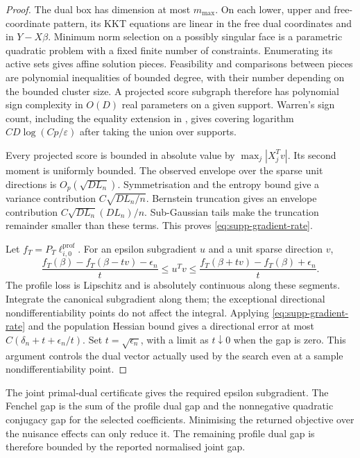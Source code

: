 \begin{proof}
The dual box has dimension at most $m_{\max}$. On each lower, upper
and free-coordinate pattern, its KKT equations are linear in the
free dual coordinates and in $Y-X\beta$. Minimum norm selection on a
possibly singular face is a parametric quadratic problem with a
fixed finite number of constraints. Enumerating its active sets gives
affine solution pieces. Feasibility and comparisons between pieces
are polynomial inequalities of bounded degree, with their number
depending on the bounded cluster size. A projected score subgraph
therefore has polynomial sign complexity in $O(D)$ real parameters
on a given support. Warren's sign count, including the equality
extension in , gives covering logarithm
$CD\log(Cp/\varepsilon)$ after taking the union over supports.

Every projected score is bounded in absolute value by
$\max_j|X_j^Tv|$. Its second moment is uniformly bounded. The observed
envelope over the sparse unit directions is $O_p(\sqrt{D L_n})$.
Symmetrisation and the entropy bound give a variance contribution
$C\sqrt{D L_n/n}$. Bernstein truncation gives an envelope
contribution $C\sqrt{D L_n}(D L_n)/n$. Sub-Gaussian tails make the
truncation remainder smaller than these terms. This proves
\eqref{eq:supp-gradient-rate}.

Let $f_T=P_T\ell_{i,0}^{\mathrm{prof}}$. For an epsilon subgradient
$u$ and a unit sparse direction $v$,
\[
 \frac{f_T(\beta)-f_T(\beta-tv)-\epsilon_n}{t}
 \leq u^Tv\leq
 \frac{f_T(\beta+tv)-f_T(\beta)+\epsilon_n}{t}.
\]
The profile loss is Lipschitz and is absolutely continuous along
these segments. Integrate the canonical subgradient along them;
the exceptional directional nondifferentiability points do not
affect the integral. Applying \eqref{eq:supp-gradient-rate} and the
population Hessian bound gives a directional error at most
$C(\delta_n+t+\epsilon_n/t)$. Set $t=\sqrt{\epsilon_n}$, with a
limit as $t\downarrow0$ when the gap is zero. This argument controls
the dual vector actually used by the search even at a sample
nondifferentiability point.
\end{proof}

The joint primal-dual certificate gives the required epsilon
subgradient. The Fenchel gap is the sum of the profile dual gap and
the nonnegative quadratic conjugacy gap for the selected coefficients.
Minimising the returned objective over the nuisance effects can only
reduce it. The remaining profile dual gap is therefore bounded by the
reported normalised joint gap.


